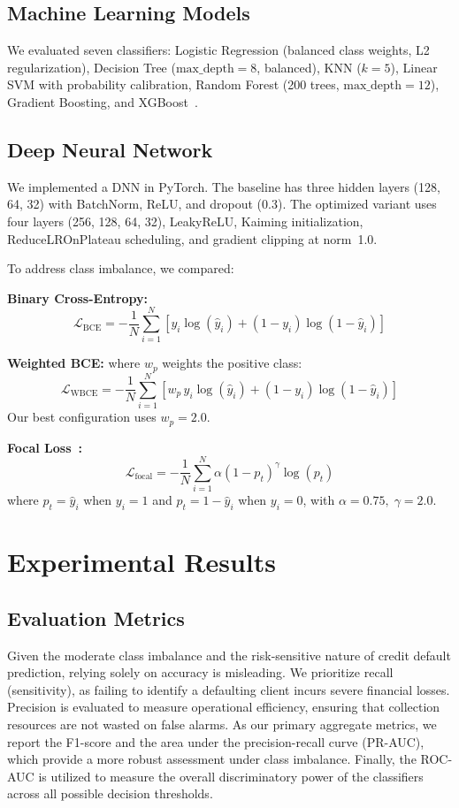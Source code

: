 \documentclass[conference]{IEEEtran}
\begin{document}
\subsection{Machine Learning Models}
We evaluated seven classifiers: Logistic Regression (balanced class weights, L2 regularization), Decision Tree ($\text{max\_depth}=8$, balanced), KNN ($k=5$), Linear SVM with probability calibration, Random Forest (200 trees, $\text{max\_depth}=12$), Gradient Boosting, and XGBoost~\cite{chen2016xgboost}.

\subsection{Deep Neural Network}
We implemented a DNN in PyTorch. The baseline has three hidden layers (128, 64, 32) with BatchNorm, ReLU, and dropout (0.3). The optimized variant uses four layers (256, 128, 64, 32), LeakyReLU, Kaiming initialization, ReduceLROnPlateau scheduling, and gradient clipping at norm~1.0.

To address class imbalance, we compared:

\textbf{Binary Cross-Entropy:}
\begin{equation}
    \mathcal{L}_{\text{BCE}} = -\frac{1}{N}\sum_{i=1}^{N}[y_i\log(\hat{y}_i) + (1-y_i)\log(1-\hat{y}_i)]
\end{equation}

\textbf{Weighted BCE:} where $w_p$ weights the positive class:
\begin{equation}
    \mathcal{L}_{\text{WBCE}} = -\frac{1}{N}\sum_{i=1}^{N}[w_p\, y_i\log(\hat{y}_i) + (1-y_i)\log(1-\hat{y}_i)]
\end{equation}
Our best configuration uses $w_p = 2.0$.

\textbf{Focal Loss~\cite{lin2017focal}:}
\begin{equation}
    \mathcal{L}_{\text{focal}} = -\frac{1}{N}\sum_{i=1}^{N}\alpha(1-p_t)^\gamma\log(p_t)
\end{equation}
where $p_t = \hat{y}_i$ when $y_i=1$ and $p_t = 1-\hat{y}_i$ when $y_i=0$, with $\alpha=0.75,\;\gamma=2.0$.

\section{Experimental Results}

\subsection{Evaluation Metrics}
Given the moderate class imbalance and the risk-sensitive nature of credit default prediction, relying solely on accuracy is misleading. We prioritize recall (sensitivity), as failing to identify a defaulting client incurs severe financial losses. Precision is evaluated to measure operational efficiency, ensuring that collection resources are not wasted on false alarms. As our primary aggregate metrics, we report the F1-score and the area under the precision-recall curve (PR-AUC), which provide a more robust assessment under class imbalance. Finally, the ROC-AUC is utilized to measure the overall discriminatory power of the classifiers across all possible decision thresholds.
\end{document}
